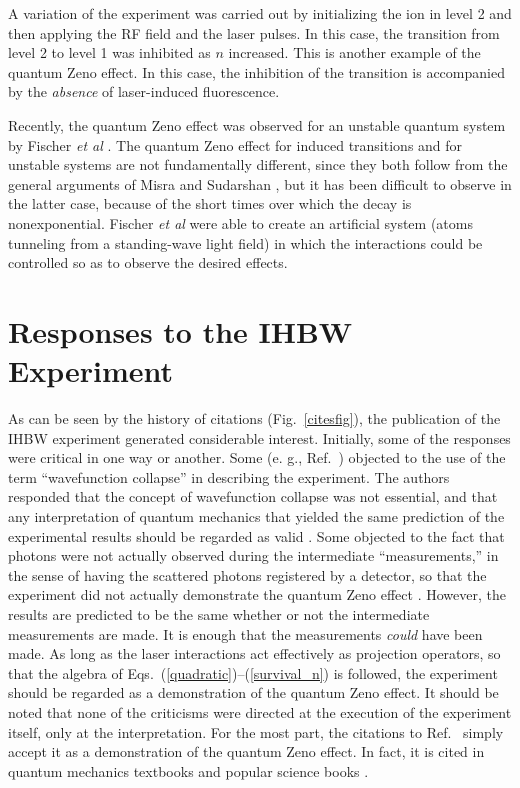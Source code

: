 \documentclass[letterpaper]{jpconf}
\begin{document}
A variation of the experiment was carried out by initializing the
ion in level 2 and then applying the RF field and the laser pulses.
In this case, the transition from level 2 to level 1 was inhibited
as $n$ increased.  This is another example of the quantum Zeno
effect.  In this case, the inhibition of the transition is
accompanied by the {\em absence} of laser-induced fluorescence.

Recently, the quantum Zeno effect was observed for an unstable
quantum system by Fischer {\em et al} \cite{fischer01}. The quantum
Zeno effect for induced transitions and for unstable systems are not
fundamentally different, since they both follow from the general
arguments of Misra and Sudarshan \cite{misra77}, but it has been
difficult to observe in the latter case, because of the short times
over which the decay is nonexponential. Fischer {\em et al} were
able to create an artificial system (atoms tunneling from a
standing-wave light field) in which the interactions could be
controlled so as to observe the desired effects.



\section{Responses to the IHBW Experiment}

As can be seen by the history of citations (Fig.~\ref{citesfig}),
the publication of the IHBW experiment \cite{itano90} generated
considerable interest.  Initially, some of the responses were
critical in one way or another.  Some (e. g.,
Ref.~\cite{ballentine91}) objected to the use of the term
``wavefunction collapse'' in describing the experiment.  The authors
responded that the concept of wavefunction collapse was not
essential, and that any interpretation of quantum mechanics that
yielded the same prediction of the experimental results should be
regarded as valid \cite{itano91}.  Some objected to the fact that
photons were not actually observed during the intermediate
``measurements,'' in the sense of having the scattered photons
registered by a detector, so that the experiment did not actually
demonstrate the quantum Zeno effect
\cite{ballentine91,petrosky90,inagaki92,pascazio93}. However, the
results are predicted to be the same whether or not the intermediate
measurements are made. It is enough that the measurements {\em
could} have been made.   As long as the laser interactions act
effectively as projection operators, so that the algebra of
Eqs.~(\ref{quadratic})--(\ref{survival_n}) is followed, the
experiment should be regarded as a demonstration of the quantum Zeno
effect. It should be noted that none of the criticisms were directed
at the execution of the experiment itself, only at the
interpretation. For the most part, the citations to
Ref.~\cite{itano90} simply accept it as a demonstration of the
quantum Zeno effect.  In fact, it is cited in quantum mechanics
textbooks \cite{griffiths95,sakurai94,peres93,braginsky92} and
popular science books \cite{whitaker96,coveney90,schulman97}.
\end{document}
